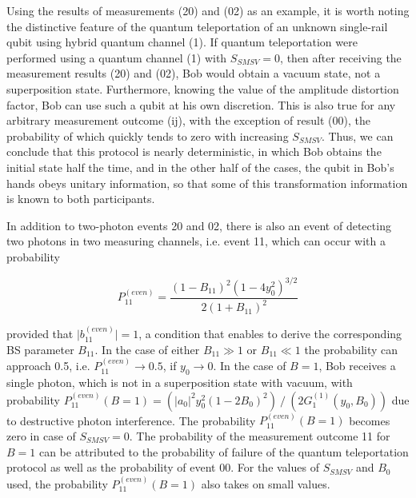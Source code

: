 \documentclass{optica-article}
\begin{document}
\par Using the results of measurements (20) and (02)  as an example, it is worth noting the distinctive feature of the quantum teleportation of an unknown single-rail qubit using hybrid quantum channel (1). If quantum teleportation were performed using a quantum channel (1) with $S_{SMSV}=0$, then after receiving the measurement results (20) and (02), Bob would obtain a vacuum state, not a superposition state. Furthermore, knowing the value of the amplitude distortion factor, Bob can use such a qubit at his own discretion. This is also true for any arbitrary measurement outcome (ij), with the exception of result (00), the probability of which quickly tends to zero with increasing $S_{SMSV}$. Thus, we can conclude that this protocol is nearly deterministic, in which Bob obtains the initial state half the time, and in the other half of the cases, the qubit in Bob's hands obeys unitary information, so that some of this transformation information is known to both participants.
\par In addition to two-photon events 20 and 02, there is also an event of detecting two photons in two measuring channels, i.e. event 11, which can occur with a probability


\begin{equation}\label{eq:26}
		P_{11}^{(even)} = \frac{(1-B_{11})^2(1-4y_0^2)^{3/2}}{2(1+B_{11})^2}
	\end{equation}

\!\!\!\!\!\!provided that $\vert b_{11}^{(even)} \lvert=1$, a condition that enables to derive the corresponding BS parameter $B_{11}$. In the case of either $B_{11}\gg1$ or $B_{11}\ll1$ the probability can approach 0.5, i.e. $P_{11}^{(even)}\rightarrow 0.5$, if $y_0 \rightarrow 0$.  In the case of $B=1$, Bob receives a single photon, which is not in a superposition state with vacuum, with probability $P_{11}^{(even)}(B=1)=(\lvert a_0 \rvert^2 y_0^2 (1-2B_0 )^2 )⁄(2G_1^{(1)}(y_0,B_0))$ due to destructive photon interference. The probability $P_{11}^{(even)}(B=1)$ becomes zero in case of $S_{SMSV}=0$. The probability of the measurement outcome 11 for $B=1$ can be attributed to the probability of failure of the quantum teleportation protocol as well as the probability of event 00. For the values of $S_{SMSV}$ and $B_0$ used, the probability $P_{11}^{(even)}(B=1)$ also takes on small values. 
\end{document}
